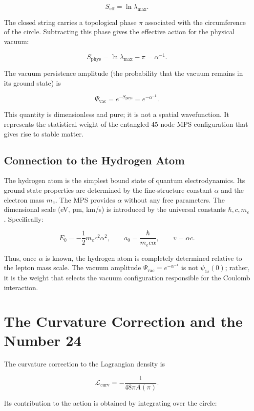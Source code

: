 \documentclass[12pt]{article}
\begin{document}
\[
S_{\text{eff}} = \ln \lambda_{\max}. \tag{4}
\]

The closed string carries a topological phase \(\pi\) associated with the circumference of the circle. Subtracting this phase gives the effective action for the physical vacuum:

\[
S_{\text{phys}} = \ln \lambda_{\max} - \pi = \alpha^{-1}. \tag{5}
\]

The vacuum persistence amplitude (the probability that the vacuum remains in its ground state) is

\[
\Psi_{\text{vac}} = e^{-S_{\text{phys}}} = e^{-\alpha^{-1}}. \tag{6}
\]

This quantity is dimensionless and pure; it is not a spatial wavefunction. It represents the statistical weight of the entangled 45-node MPS configuration that gives rise to stable matter.

\subsection{Connection to the Hydrogen Atom}

The hydrogen atom is the simplest bound state of quantum electrodynamics. Its ground state properties are determined by the fine-structure constant \(\alpha\) and the electron mass \(m_e\). The MPS provides \(\alpha\) without any free parameters. The dimensional scale (eV, pm, km/s) is introduced by the universal constants \(\hbar, c, m_e\). Specifically:

\[
E_0 = -\frac{1}{2} m_e c^2 \alpha^2, \qquad
a_0 = \frac{\hbar}{m_e c \alpha}, \qquad
v = \alpha c. \tag{7}
\]

Thus, once \(\alpha\) is known, the hydrogen atom is completely determined relative to the lepton mass scale. The vacuum amplitude \(\Psi_{\text{vac}} = e^{-\alpha^{-1}}\) is not \(\psi_{1s}(0)\); rather, it is the weight that selects the vacuum configuration responsible for the Coulomb interaction.

\section{The Curvature Correction and the Number 24}

The curvature correction to the Lagrangian density is

\[
\mathcal{L}_{\text{curv}} = -\frac{1}{48\pi A(\pi)}. \tag{8}
\]

Its contribution to the action is obtained by integrating over the circle:
\end{document}
